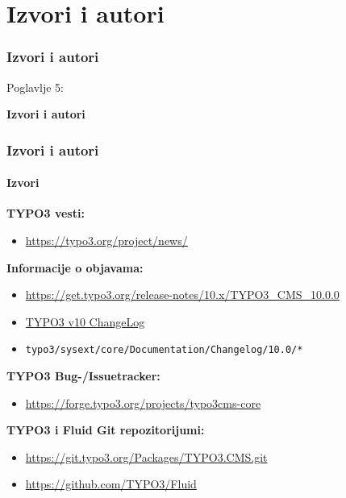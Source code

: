 %

\section{Izvori i autori}
\begin{frame}[fragile]
	\frametitle{Izvori i autori}

	\begin{center}\huge{Poglavlje 5:}\end{center}
	\begin{center}\huge{\color{typo3darkgrey}\textbf{Izvori i autori}}\end{center}

\end{frame}


\begin{frame}[fragile]
	\frametitle{Izvori i autori}
	\framesubtitle{Izvori}

	\textbf{TYPO3 vesti:}
		\begin{itemize}\smaller
			\item \url{https://typo3.org/project/news/}
		\end{itemize}

	\textbf{Informacije o objavama:}
		\begin{itemize}\smaller
			\item \url{https://get.typo3.org/release-notes/10.x/TYPO3_CMS_10.0.0}
			\item \href{https://docs.typo3.org/c/typo3/cms-core/master/en-us/Changelog-10.html}{TYPO3 v10 ChangeLog}
			\item \texttt{typo3/sysext/core/Documentation/Changelog/10.0/*}
		\end{itemize}

	\textbf{TYPO3 Bug-/Issuetracker:}
		\begin{itemize}\smaller
			\item \url{https://forge.typo3.org/projects/typo3cms-core}
		\end{itemize}

	\textbf{TYPO3 i Fluid Git repozitorijumi:}
		\begin{itemize}\smaller
			\item \url{https://git.typo3.org/Packages/TYPO3.CMS.git}
			\item \url{https://github.com/TYPO3/Fluid}
		\end{itemize}

\end{frame}

